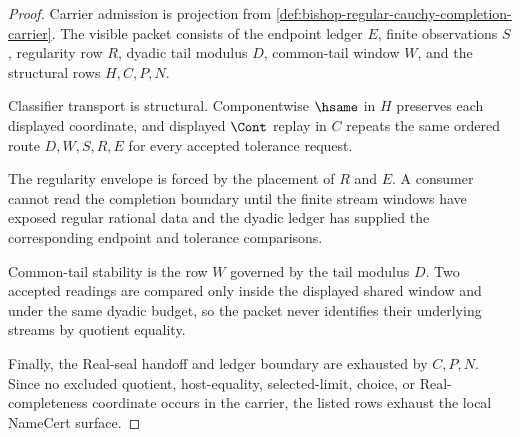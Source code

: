 \begin{proof}
Carrier admission is projection from \autoref{def:bishop-regular-cauchy-completion-carrier}. The visible packet consists of the endpoint ledger $E$, finite observations $S$, regularity row $R$, dyadic tail modulus $D$, common-tail window $W$, and the structural rows $H,C,P,N$.

Classifier transport is structural. Componentwise $\hsame$ in $H$ preserves each displayed coordinate, and displayed $\Cont$ replay in $C$ repeats the same ordered route $D,W,S,R,E$ for every accepted tolerance request.

The regularity envelope is forced by the placement of $R$ and $E$. A consumer cannot read the completion boundary until the finite stream windows have exposed regular rational data and the dyadic ledger has supplied the corresponding endpoint and tolerance comparisons.

Common-tail stability is the row $W$ governed by the tail modulus $D$. Two accepted readings are compared only inside the displayed shared window and under the same dyadic budget, so the packet never identifies their underlying streams by quotient equality.

Finally, the Real-seal handoff and ledger boundary are exhausted by $C,P,N$. Since no excluded quotient, host-equality, selected-limit, choice, or Real-completeness coordinate occurs in the carrier, the listed rows exhaust the local NameCert surface.
\end{proof}

